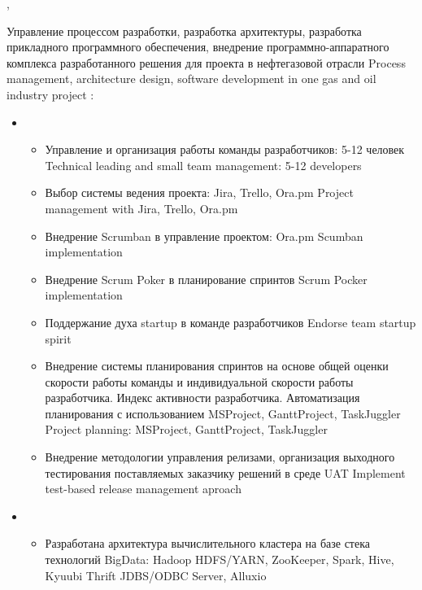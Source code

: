 \documentclass[11pt,a4paper,sans, russian]{moderncv}        %
\begin{document}
{\protect{}}
{\cityspb, \country}
{}
{
	{Управление процессом разработки, разработка архитектуры, разработка прикладного программного обеспечения, внедрение программно-аппаратного комплекса разработанного решения для проекта в нефтегазовой отрасли}
	{Process management, architecture design, software development in one gas and oil industry project}
	\newline{}
	\achievements:
	\begin{itemize}
		\item {}
		\begin{itemize}
			\item {}
				{Управление и организация работы команды разработчиков: 5-12 человек}
				{Technical leading and small team management: 5-12 developers}
			\item {}
				{Выбор системы ведения проекта: Jira, Trello, Ora.pm}
				{Project management with Jira, Trello, Ora.pm}
			\item {}
				{Внедрение Scrumban в управление проектом: Ora.pm}
				{Scumban implementation}
			\item {}
				{Внедрение Scrum Poker в планирование спринтов}
				{Scrum Pocker implementation}
			\item {}
				{Поддержание духа startup в команде разработчиков}
				{Endorse team startup spirit}
			\item {}
				{Внедрение системы планирования спринтов на основе общей оценки скорости работы команды и индивидуальной скорости работы разработчика. Индекс активности разработчика. Автоматизация планирования с использованием MSProject, GanttProject, TaskJuggler}
				{Project planning: MSProject, GanttProject, TaskJuggler}
			\item {}
				{Внедрение методологии управления релизами, организация выходного тестирования поставляемых заказчику решений в среде UAT}
				{Implement test-based release management aproach}
		\end{itemize}
		\item {}
		\begin{itemize}
			\item {}
				{Разработана архитектура вычислительного кластера на базе стека технологий BigData: Hadoop HDFS/YARN, ZooKeeper, Spark, Hive, Kyuubi Thrift JDBS/ODBC Server, Alluxio}

\end{itemize}
\end{itemize}}
\end{document}
